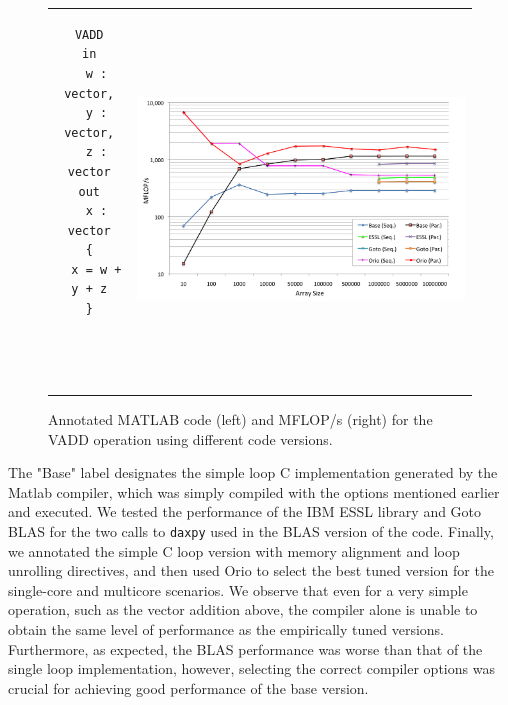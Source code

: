 \documentclass[11pt]{article}
\begin{document}
\begin{figure}[htp]
\centering
\begin{tabular}{cc}
\begin{minipage}[b]{.25\textwidth}
\footnotesize
\begin{verbatim}
VADD
in
  w : vector,
  y : vector,
  z : vector
out
  x : vector
{
  x = w + y + z
}




\end{verbatim}
\end{minipage}
&
\begin{minipage}[b]{.6\textwidth}
\includegraphics[width=\textwidth]{figures/vadd_bgp.png}
\end{minipage}\\
\end{tabular}
\caption{Annotated MATLAB code (left) and MFLOP/s (right) for the VADD operation using different code versions.}
\label{fig:vadd}
\end{figure}

The "Base" label designates the simple loop C implementation generated by the Matlab compiler, which was simply compiled with the options mentioned earlier and executed. We tested the performance of the IBM ESSL library and Goto BLAS for the two calls to \texttt{daxpy} used in the BLAS version of the code. Finally, we annotated the simple C loop version with memory alignment and loop unrolling directives, and then used Orio to select the best tuned version for the single-core and multicore scenarios. We observe that even for a very simple operation, such as the vector addition above, the compiler alone is unable to obtain the same level of performance as the empirically tuned versions. Furthermore, as expected, the BLAS performance was worse than that of the single loop implementation, however, selecting the correct compiler options was crucial for achieving good performance of the base version.
\end{document}
